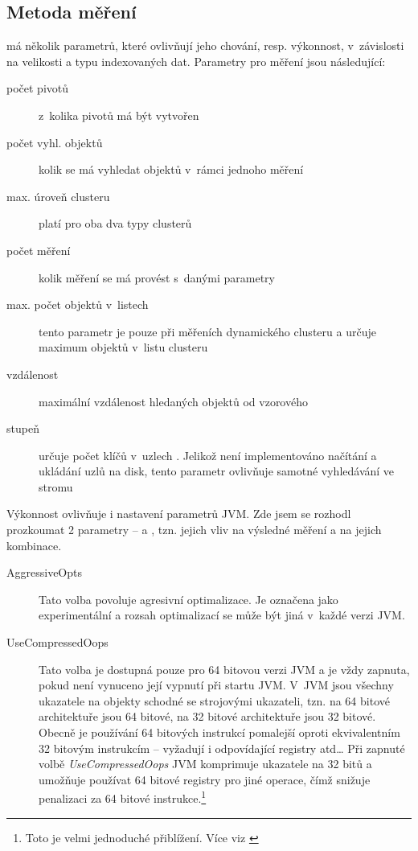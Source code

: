 \subsection{Metoda měření\label{sec:measurementmethod}}

\MIndex{} má několik parametrů, které ovlivňují jeho chování, resp. výkonnost, v~závislosti na velikosti a typu indexovaných dat. Parametry pro měření jsou následující:
\begin{description}
\item[počet pivotů] z~kolika pivotů má být vytvořen \MIndex{}
\item[počet vyhl. objektů] kolik se má vyhledat objektů v~rámci jednoho měření
\item[max. úroveň clusteru] platí pro oba dva typy clusterů
\item[počet měření] kolik měření se má provést s~danými parametry
\item[max. počet objektů v~listech] tento parametr je pouze při měřeních dynamického clusteru a určuje maximum objektů v~listu clusteru
\item[vzdálenost] maximální vzdálenost hledaných objektů od vzorového
\item[stupeň \BPTree{}] určuje počet klíčů v~uzlech \BPTree{}. Jelikož není implementováno načítání a ukládání uzlů na disk, tento parametr ovlivňuje samotné vyhledávání ve stromu
\end{description}

Výkonnost  ovlivňuje i nastavení parametrů JVM.
Zde jsem se rozhodl prozkoumat 2 parametry --  a , tzn. jejich vliv na výsledné měření a na jejich kombinace.

\begin{description}
\item[AggressiveOpts] Tato volba povoluje agresivní optimalizace.
Je označena jako experimentální a rozsah optimalizací se může být jiná v~každé verzi JVM.
\item[UseCompressedOops] Tato volba je dostupná pouze pro 64 bitovou verzi JVM a je vždy zapnuta, pokud není vynuceno její vypnutí při startu JVM.
V~JVM jsou všechny ukazatele na objekty schodné se strojovými ukazateli, tzn. na 64 bitové architektuře jsou 64 bitové, na 32 bitové architektuře jsou 32 bitové.
Obecně je používání 64 bitových instrukcí pomalejší oproti ekvivalentním 32 bitovým instrukcím -- vyžadují i odpovídající registry atd\ldots{}
Při zapnuté volbě \emph{UseCompressedOops} JVM komprimuje ukazatele na 32 bitů a umožňuje používat 64 bitové registry pro jiné operace, čímž snižuje penalizaci za 64 bitové instrukce.\footnote{Toto je velmi jednoduché přiblížení. Více viz \cite{hunt2011java}}
\end{description}


